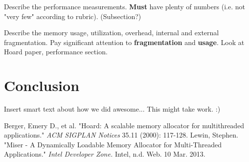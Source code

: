 \documentclass{article}
\begin{document}
Describe the performance measurements. \textbf{Must} have plenty of numbers 
(i.e. not "very few" according to rubric). (Subsection?)

Describe the memory usage, utilization, overhead, internal and external 
fragmentation. Pay significant attention to \textbf{fragmentation} and 
\textbf{usage}. Look at Hoard paper, performance section. 

\newpage
\section{Conclusion}
\label{sec:conclusion}

Insert smart text about how we did awesome... This might take work. :)

\newpage

\begin{thebibliography}{9}
	
		Berger, Emery D., et al.
		"Hoard: A scalable memory allocator for multithreaded applications."
		\textit{ACM SIGPLAN Notices} 35.11 
		(2000): 
		117-128.
		Lewin, Stephen.
		"Miser - A Dynamically Loadable Memory Allocator for Multi-Threaded Applications."
		\textit{Intel Developer Zone.}
		Intel, 
		n.d. Web. 10 Mar. 2013.

\end{thebibliography}
\end{document}
